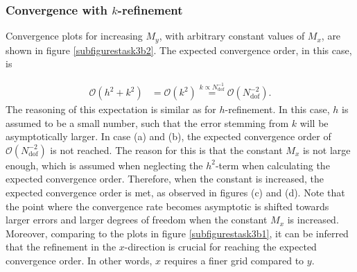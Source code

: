 \subsubsection*{Convergence with $k$-refinement}
Convergence plots for increasing $M_y$, with arbitrary constant values of $M_x$, are shown in figure \ref{subfigurestask3b2}. The expected convergence order, in this case, is

\begin{equation*}
\begin{split}
    \mathcal{O}(h^2 + k^2) &= \mathcal{O}(k^2) \overset{k \propto N_{\mathrm{dof}}^{-1}}= \mathcal{O}(N_{\mathrm{dof}}^{-2}). 
\end{split}
\end{equation*}
The reasoning of this expectation is similar as for $h$-refinement. In this case, $h$ is assumed to be a small number, such that the error stemming from $k$ will be asymptotically larger. In case (a) and (b), the expected convergence order of $\mathcal{O}(N_{\mathrm{dof}}^{-2})$ is not reached. The reason for this is that the constant $M_x$ is not large enough, which is assumed when neglecting the $h^2$-term when calculating the expected convergence order. Therefore, when the constant is increased, the expected convergence order is met, as observed in figures (c) and (d). Note that the point where the convergence rate becomes asymptotic is shifted towards larger errors and larger degrees of freedom when the constant $M_x$ is increased. Moreover, comparing to the plots in figure \ref{subfigurestask3b1}, it can be inferred that the refinement in the $x$-direction is crucial for reaching the expected convergence order. In other words, $x$ requires a finer grid compared to $y$. 

